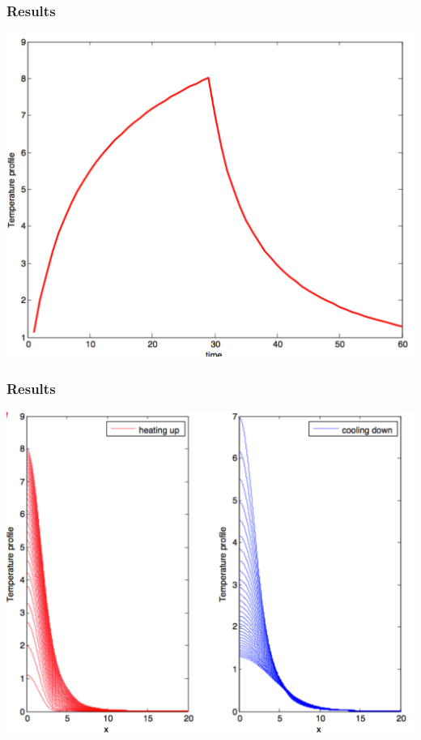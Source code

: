 \documentclass{beamer}
\begin{document}
\begin{frame}
\frametitle{Results}
\begin{center}
\includegraphics[scale = 0.42 ]{Pages/Temperature_profile_Jessica.pdf}
\end{center}
\end{frame}
\begin{frame}
\frametitle{Results}
\begin{center}
\includegraphics[scale = 0.3]{Pages/heating_cooling_Jessica.pdf}
\end{center}
\end{frame}
\end{document}
